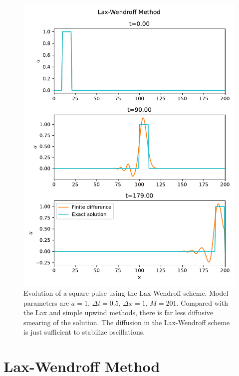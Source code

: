 \documentclass[%
 reprint,
 amsmath,amssymb,
 aps,
]{revtex4-2}
\begin{document}
\begin{figure}[h]
\includegraphics[width=0.9\linewidth]{proj2-1/snapshots-lax-wendroff.pdf}
\caption{\label{fig:snapshots-lax-wendroff}Evolution of a square pulse using the Lax-Wendroff scheme. Model parameters are $a=1$, $\Delta t=0.5$, $\Delta x=1$, $M=201$. Compared with the Lax and simple upwind methods, there is far less diffusive smearing of the solution. The diffusion in the Lax-Wendroff scheme is just sufficient to stabilize oscillations.}
\end{figure}

\section{Lax-Wendroff Method}
\end{document}
